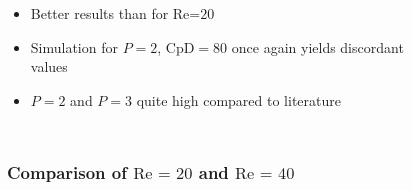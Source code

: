 \begin{frame}[allowframebreaks]
			\begin{columns}[t]
				\column[]{5cm}
				\begin{itemize}
					\item Better results than for $\text{Re=20}$
					\item Simulation for $P=2$, $\text{CpD}=80$ once again yields discordant values
					\item $P=2$ and $P=3$ quite high compared to literature
				\end{itemize}
				\column[]{7cm}
				\begin{figure}[htp]
					\centering		
					
				\end{figure}
			\end{columns}
		\end{frame}
		\begin{frame}
			\frametitle{Comparison of $\text{Re = 20}$ and $\text{Re = 40}$}
			\begin{center}
		\vspace{-0.3cm}
	\end{center}
			\begin{figure}
				\vspace{-0.5cm}
				\centering
			\end{figure}
	\end{frame}
